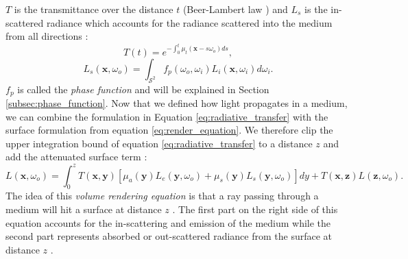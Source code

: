 $T$ is the transmittance over the distance $t$ (Beer-Lambert law \cite{lambert}) and $L_s$ is the in-scattered radiance which accounts for the radiance scattered into the medium from all directions \cite{novak_overview}:
\begin{equation}
    \label{eq:beer_lambert_law}
    T(t) = e^{-\int_0^t \mu_t(\boldsymbol{x} - s\omega_o)ds},
\end{equation}
\begin{equation}
    \label{eq:in_scattered_radiance}
    L_s(\boldsymbol{x}, \omega_o) = \int_{\mathcal{S}^2} f_p(\omega_o, \omega_i)L_i(\boldsymbol{x}, \omega_i)d\omega_i.
\end{equation}
$f_p$ is called the \textit{phase function} and will be explained in Section \ref{subsec:phase_function}.
Now that we defined how light propagates in a medium, we can combine the formulation in Equation \ref{eq:radiative_transfer} with the surface formulation from equation \ref{eq:render_equation}.
We therefore clip the upper integration bound of equation \ref{eq:radiative_transfer} to a distance $z$ and add the attenuated surface term \cite{novak_overview}:
\begin{equation*}
    L(\boldsymbol{x}, \omega_o) = \int_0^z T(\boldsymbol{x}, \boldsymbol{y})[\mu_a(\boldsymbol{y})L_e(\boldsymbol{y}, \omega_o) + \mu_s(\boldsymbol{y})L_s(\boldsymbol{y}, \omega_o)]dy + T(\boldsymbol{x}, \boldsymbol{z})L(\boldsymbol{z}, \omega_o).
\end{equation*}
The idea of this \textit{volume rendering equation} is that a ray passing through a medium will hit a surface at distance $z$ \cite{novak_overview}.
The first part on the right side of this equation accounts for the in-scattering and emission of the medium while the second part represents absorbed or out-scattered radiance from the surface at distance $z$ \cite{novak_overview}.

